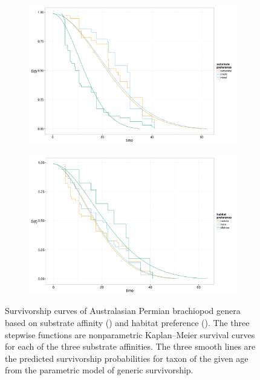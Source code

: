 \documentclass[12pt,letterpaper]{article}
\begin{document}
\begin{figure}[ht]
  \begin{subfigure}[b]{0.5\textwidth}
    \caption{}
    \includegraphics[height = 0.4\textheight, width = \textwidth, keepaspectratio = true]{figure/aff}
    \label{subfig:aff_surv}
  \end{subfigure}
  \begin{subfigure}[b]{0.5\textwidth}
    \caption{}
    \includegraphics[height = 0.4\textheight, width = \textwidth, keepaspectratio = true]{figure/hab}
    \label{subfig:env_surv}
  \end{subfigure}
  \caption{Survivorship curves of Australasian Permian brachiopod genera based on substrate affinity () and habitat preference (). The three stepwise functions are nonparametric Kaplan--Meier survival curves for each of the three substrate affinities. The three smooth lines are the predicted survivorship probabilities for taxon of the given age from the parametric model of generic survivorship.}%
  \label{fig:brach_surv}
\end{figure}
\end{document}
